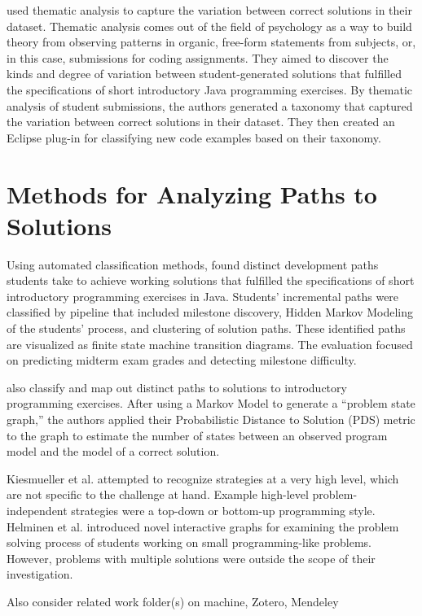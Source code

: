 \citet{Luxton13} used thematic analysis to capture the variation between correct solutions in their dataset. Thematic analysis comes out of the field of psychology as a way to build theory from observing patterns in organic, free-form statements from subjects, or, in this case, submissions for coding assignments. They aimed to discover the kinds and degree of variation between student-generated solutions that fulfilled the specifications of short introductory Java programming exercises. By thematic analysis of student submissions, the authors generated a taxonomy that captured the variation between correct solutions in their dataset. They then created an Eclipse plug-in for classifying new code examples based on their taxonomy. 

\section{Methods for Analyzing Paths to Solutions}

Using automated classification methods, \citet{Piech} found distinct development paths students take to achieve working solutions that fulfilled the specifications of short introductory programming exercises in Java. Students' incremental paths were classified by pipeline that included milestone discovery, Hidden Markov Modeling of the students' process, and clustering of solution paths. These identified paths are visualized as finite state machine transition diagrams. The evaluation focused on predicting midterm exam grades and detecting milestone difficulty.

\citet{sudol12} also classify and map out distinct paths to solutions to introductory programming exercises. After using a Markov Model to generate a ``problem state graph,'' the authors applied their Probabilistic Distance to Solution (PDS) metric to the graph to estimate the number of states between an observed program model and the model of a correct solution.

Kiesmueller et al. \cite{Kiesmueller} attempted to recognize strategies at a very high level, which are not specific to the challenge at hand. Example high-level problem-independent strategies were a top-down or bottom-up programming style. Helminen et al. \cite{ICERHelminen} introduced novel interactive graphs for examining the problem solving process of students working on small programming-like problems. However, problems with multiple solutions were outside the scope of their investigation.








Also consider related work folder(s) on machine, Zotero, Mendeley





